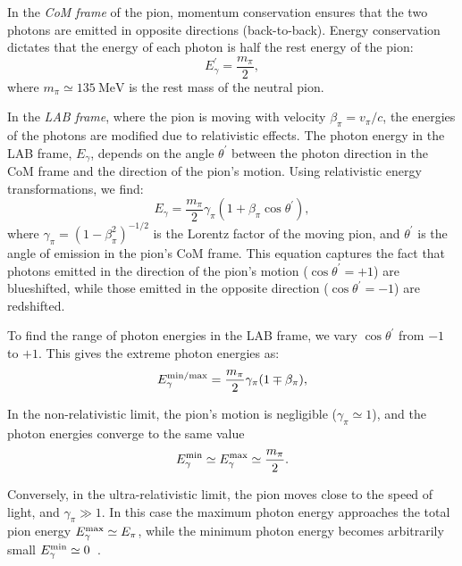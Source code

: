 In the \emph{CoM frame} of the pion, momentum conservation ensures that the two photons are emitted in opposite directions (back-to-back). Energy conservation dictates that the energy of each photon is half the rest energy of the pion:
\begin{equation}
E_\gamma^\prime = \frac{m_\pi}{2},
\end{equation}
where \(m_\pi \simeq 135~\text{MeV}\) is the rest mass of the neutral pion.  

In the \emph{LAB frame}, where the pion is moving with velocity \(\beta_\pi = v_\pi / c\), the energies of the photons are modified due to relativistic effects. The photon energy in the LAB frame, \(E_\gamma\), depends on the angle \(\theta^\prime\) between the photon direction in the CoM frame and the direction of the pion's motion. 
%
Using relativistic energy transformations, we find:
\begin{equation}\label{eq:egammaboost}
E_\gamma = \frac{m_\pi}{2} \gamma_\pi (1 + \beta_\pi \cos \theta^\prime),
\end{equation}
where \(\gamma_\pi = (1 - \beta_\pi^2)^{-1/2}\) is the Lorentz factor of the moving pion,  and \(\theta^\prime\) is the angle of emission in the pion’s CoM frame.  
%
This equation captures the fact that photons emitted in the direction of the pion's motion (\(\cos \theta^\prime = +1\)) are blueshifted, while those emitted in the opposite direction (\(\cos \theta^\prime = -1\)) are redshifted.  

To find the range of photon energies in the LAB frame, we vary \(\cos \theta^\prime\) from \(-1\) to \(+1\). This gives the extreme photon energies as:
\begin{equation}\label{eq:gammaminmax}
E_\gamma^{\rm min/max} = \frac{m_\pi}{2} \gamma_\pi (1 \mp \beta_\pi),
\end{equation}

In the non-relativistic limit, the pion’s motion is negligible (\(\gamma_\pi \simeq 1\)), and the photon energies converge to the same value 
\begin{equation} 
E_\gamma^{\rm min} \simeq E_\gamma^{\rm max} \simeq \frac{m_\pi}{2}.
\end{equation}

Conversely, in the ultra-relativistic limit, the pion moves close to the speed of light, and \(\gamma_\pi \gg 1\). In this case the maximum photon energy approaches the total pion energy \( E_\gamma^{\rm max} \simeq E_\pi \), while the minimum photon energy becomes arbitrarily small \( E_\gamma^{\rm min} \simeq 0 \)~.


